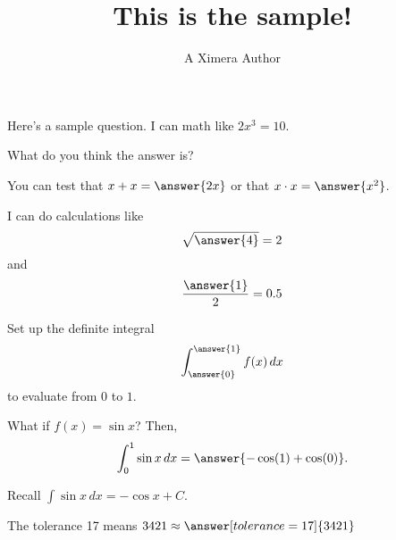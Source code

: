 \documentclass{ximera}
\title{This is the sample!}
\author{A Ximera Author}
\begin{document}
\maketitle

Here's a sample question.  I can math like $2x^3 = 10$.

\begin{problem}
  What do you think the answer is?

  \begin{multipleChoice}
  \end{multipleChoice}
\end{problem}

\begin{problem}
  \begin{multipleChoice}
  \end{multipleChoice}
\end{problem}

\begin{problem}
  You can test that $x + x = \answer{2x}$
  or that $x \cdot x = \answer{x^2}$.

  I can do calculations like 
  \[
    \sqrt{\answer{4}} = 2
  \]
  and
  \[
    \frac{\answer{1}}{2} = 0.5
  \]
\end{problem}

\begin{problem}
  Set up the definite integral
    \[
      \int_{\answer{0}}^{\answer{1}} f(x) \, dx
    \]
  to evaluate from $0$ to $1$.

  \begin{question}
    What if $f(x) = \sin x$?  Then,
    \[
       \int_0^1 \sin x \, dx = \answer{-\cos(1) + \cos(0)}.
    \]

    \begin{hint}
      Recall $\int \sin x \, dx = -\cos x + C$.
    \end{hint}
  \end{question}
\end{problem}

\begin{problem}
   The tolerance 17 means $3421 \approx \answer[tolerance=17]{3421}$
\end{problem}
\end{document}
